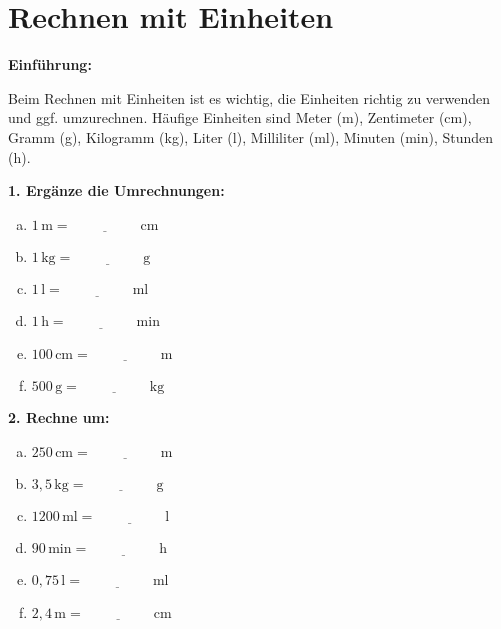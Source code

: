 \section*{Rechnen mit Einheiten}

\textbf{Einführung:}

Beim Rechnen mit Einheiten ist es wichtig, die Einheiten richtig zu verwenden und ggf. umzurechnen. Häufige Einheiten sind Meter (m), Zentimeter (cm), Gramm (g), Kilogramm (kg), Liter (l), Milliliter (ml), Minuten (min), Stunden (h).

\vspace{0.5em}

\textbf{1. Ergänze die Umrechnungen:}
\begin{multicols}{2}
\begin{enumerate}[a)]
    \item $1\,\mathrm{m} = \underline{\hspace{2cm}}\,\mathrm{cm}$
    \item $1\,\mathrm{kg} = \underline{\hspace{2cm}}\,\mathrm{g}$
    \item $1\,\mathrm{l} = \underline{\hspace{2cm}}\,\mathrm{ml}$
    \item $1\,\mathrm{h} = \underline{\hspace{2cm}}\,\mathrm{min}$
    \item $100\,\mathrm{cm} = \underline{\hspace{2cm}}\,\mathrm{m}$
    \item $500\,\mathrm{g} = \underline{\hspace{2cm}}\,\mathrm{kg}$
\end{enumerate}
\end{multicols}

\vspace{0.5em}

\textbf{2. Rechne um:}
\begin{multicols}{2}
\begin{enumerate}[a)]
    \item $250\,\mathrm{cm} = \underline{\hspace{2cm}}\,\mathrm{m}$
    \item $3{,}5\,\mathrm{kg} = \underline{\hspace{2cm}}\,\mathrm{g}$
    \item $1200\,\mathrm{ml} = \underline{\hspace{2cm}}\,\mathrm{l}$
    \item $90\,\mathrm{min} = \underline{\hspace{2cm}}\,\mathrm{h}$
    \item $0{,}75\,\mathrm{l} = \underline{\hspace{2cm}}\,\mathrm{ml}$
    \item $2{,}4\,\mathrm{m} = \underline{\hspace{2cm}}\,\mathrm{cm}$
\end{enumerate}
\end{multicols}


